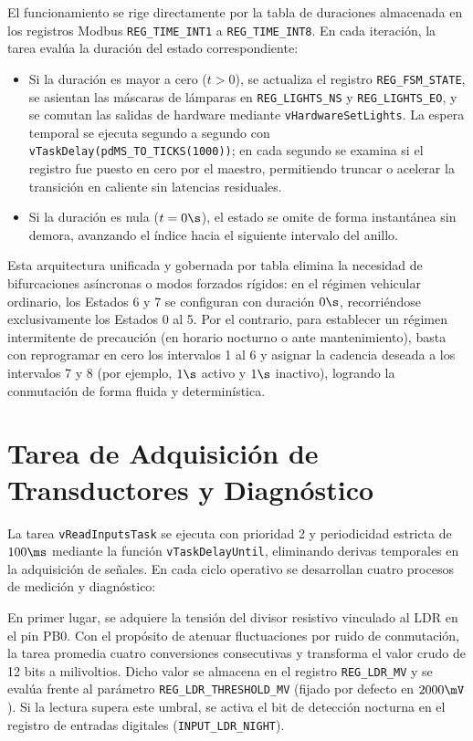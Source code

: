 El funcionamiento se rige directamente por la tabla de duraciones almacenada en los registros Modbus
\texttt{REG\_TIME\_INT1} a \texttt{REG\_TIME\_INT8}. En cada iteración, la tarea evalúa la duración del estado
correspondiente:
\begin{itemize}
  \item Si la duración es mayor a cero ($t > 0$), se actualiza el registro \texttt{REG\_FSM\_STATE}, se
    asientan las máscaras de lámparas en \texttt{REG\_LIGHTS\_NS} y \texttt{REG\_LIGHTS\_EO}, y se comutan las salidas de
    hardware mediante \texttt{vHardwareSetLights}. La espera temporal se ejecuta segundo a segundo con
    \texttt{vTaskDelay(pdMS\_TO\_TICKS(1000))}; en cada segundo se examina si el registro fue puesto en cero por el
    maestro, permitiendo truncar o acelerar la transición en caliente sin latencias residuales.
  \item Si la duración es nula ($t = 0\s$), el estado se omite de forma instantánea sin demora, avanzando el índice
    hacia el siguiente intervalo del anillo.
\end{itemize}

Esta arquitectura unificada y gobernada por tabla elimina la necesidad de bifurcaciones asíncronas o modos forzados
rígidos: en el régimen vehicular ordinario, los Estados 6 y 7 se configuran con duración $0\s$, recorriéndose
exclusivamente los Estados 0 al 5. Por el contrario, para establecer un régimen intermitente de precaución (en horario
nocturno o ante mantenimiento), basta con reprogramar en cero los intervalos 1 al 6 y asignar la cadencia deseada a los
intervalos 7 y 8 (por ejemplo, $1\s$ activo y $1\s$ inactivo), logrando la conmutación de forma fluida y determinística.

\section{Tarea de Adquisición de Transductores y Diagnóstico}
\label{sec:inputs_task}

La tarea \texttt{vReadInputsTask} se ejecuta con prioridad 2 y periodicidad estricta de $100\ms$ mediante la función
\texttt{vTaskDelayUntil}, eliminando derivas temporales en la adquisición de señales. En cada ciclo operativo se
desarrollan cuatro procesos de medición y diagnóstico:

En primer lugar, se adquiere la tensión del divisor resistivo vinculado al LDR en el pin PB0. Con el propósito de
atenuar fluctuaciones por ruido de conmutación, la tarea promedia cuatro conversiones consecutivas y transforma el valor
crudo de 12 bits a milivoltios. Dicho valor se almacena en el registro \texttt{REG\_LDR\_MV} y se evalúa frente al
parámetro \texttt{REG\_LDR\_THRESHOLD\_MV} (fijado por defecto en $2000\mV$). Si la lectura supera este umbral, se
activa el bit de detección nocturna en el registro de entradas digitales (\texttt{INPUT\_LDR\_NIGHT}).

